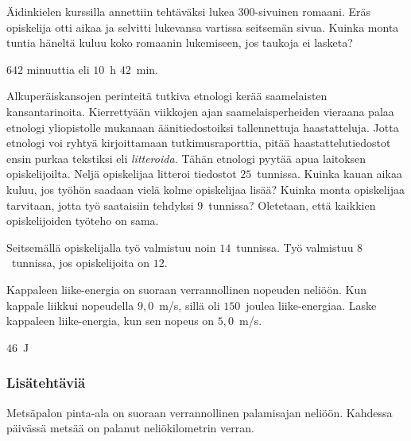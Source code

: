 \begin{tehtavasivu}
\begin{tehtava}
    Äidinkielen kurssilla annettiin tehtäväksi lukea 300-sivuinen romaani.
    Eräs opiskelija otti aikaa ja selvitti lukevansa vartissa seitsemän sivua.
    Kuinka monta tuntia häneltä kuluu koko romaanin lukemiseen, jos
    taukoja ei lasketa?
    
    \begin{vastaus}
        $642$ minuuttia eli $10$~h $42$~min.
    \end{vastaus}
\end{tehtava}

\begin{tehtava}
Alkuperäiskansojen perinteitä tutkiva etnologi kerää saamelaisten kansantarinoita. Kierrettyään viikkojen ajan saamelaisperheiden vieraana palaa etnologi yliopistolle mukanaan äänitiedostoiksi tallennettuja haastatteluja. Jotta etnologi voi ryhtyä kirjoittamaan tutkimusraporttia, pitää haastattelutiedostot ensin purkaa tekstiksi eli \emph{litteroida.} Tähän etnologi pyytää apua laitoksen opiskelijoilta. Neljä opiskelijaa litteroi tiedostot $25$~tunnissa. Kuinka kauan aikaa kuluu, jos työhön saadaan vielä kolme opiskelijaa lisää? Kuinka monta opiskelijaa tarvitaan, jotta työ saataisiin tehdyksi $9$~tunnissa? Oletetaan, että kaikkien opiskelijoiden työteho on sama.

\begin{vastaus}
Seitsemällä opiskelijalla työ valmistuu noin $14$~tunnissa. Työ valmistuu $8$~tunnissa, jos opiskelijoita on $12$.
\end{vastaus}
\end{tehtava}

\begin{tehtava}
	Kappaleen liike-energia on suoraan verrannollinen nopeuden neliöön.
	Kun kappale liikkui nopeudella $9,0$~m/s, sillä oli $150$~joulea liike-energiaa.
	Laske kappaleen liike-energia, kun sen nopeus on $5,0$~m/s. 
	\begin{vastaus}
		$46$~J
	\end{vastaus}
\end{tehtava}

\subsubsection*{Lisätehtäviä}

\begin{tehtava}
	Metsäpalon pinta-ala on suoraan verrannollinen palamisajan neliöön. Kahdessa päivässä metsää on palanut neliökilometrin verran. 
	\begin{alakohdat}
\end{alakohdat} 
	\begin{vastaus}
		\begin{alakohdat}
\end{alakohdat} 
	\end{vastaus}
\end{tehtava}


\end{tehtavasivu}
